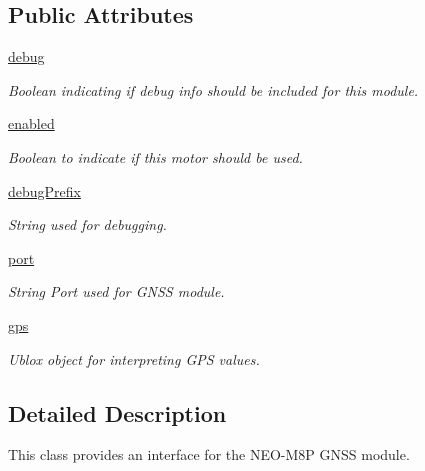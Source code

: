 \subsection*{Public Attributes}
\begin{DoxyCompactItemize}
\item 
\mbox{\label{classNEO__M8P_1_1NEO__M8P_a32feaecbad676c5cea0eb8315695e852}} 
\hyperlink{classNEO__M8P_1_1NEO__M8P_a32feaecbad676c5cea0eb8315695e852}{debug}
\begin{DoxyCompactList}\small\item\em Boolean indicating if debug info should be included for this module. \end{DoxyCompactList}\item 
\hyperlink{classNEO__M8P_1_1NEO__M8P_af7c5a97b95ae3125ccf22b7a322ac71b}{enabled}
\begin{DoxyCompactList}\small\item\em Boolean to indicate if this motor should be used. \end{DoxyCompactList}\item 
\mbox{\label{classNEO__M8P_1_1NEO__M8P_a9134a7efad0780ed0d02f207e900efe6}} 
\hyperlink{classNEO__M8P_1_1NEO__M8P_a9134a7efad0780ed0d02f207e900efe6}{debug\+Prefix}
\begin{DoxyCompactList}\small\item\em String used for debugging. \end{DoxyCompactList}\item 
\hyperlink{classNEO__M8P_1_1NEO__M8P_a1eb6a0afe8bd7796703c9d48d51fe41b}{port}
\begin{DoxyCompactList}\small\item\em String Port used for G\+N\+SS module. \end{DoxyCompactList}\item 
\mbox{\label{classNEO__M8P_1_1NEO__M8P_a03dc2803bcec9ec892fe434c907c9c51}} 
\hyperlink{classNEO__M8P_1_1NEO__M8P_a03dc2803bcec9ec892fe434c907c9c51}{gps}
\begin{DoxyCompactList}\small\item\em Ublox object for interpreting G\+PS values. \end{DoxyCompactList}\end{DoxyCompactItemize}


\subsection{Detailed Description}
This class provides an interface for the N\+E\+O-\/\+M8P G\+N\+SS module. 

